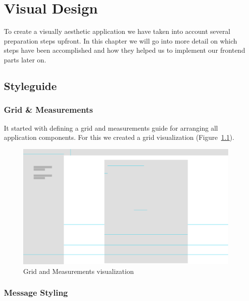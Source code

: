 \chapter{Visual Design}

To create a visually aesthetic application we have taken into account several preparation steps upfront. In this chapter
we will go into more detail on which steps have been accomplished and how they helped us to implement our frontend parts
later on.

\section{Styleguide}\label{sec:styleguide}

\subsection{Grid \& Measurements}\label{subsec:grid-and-measurements}

It started with defining a grid and measurements guide for arranging all application components. For this we created a
grid visualization (Figure~\ref{fig:grid}).

\begin{figure}[!ht]
    \centering
    \includegraphics[width=1.0\textwidth]{./images/grid.pdf}
    \caption{Grid and Measurements visualization}
    \label{fig:grid}
\end{figure}

\subsection{Message Styling}\label{subsec:message-styling}

